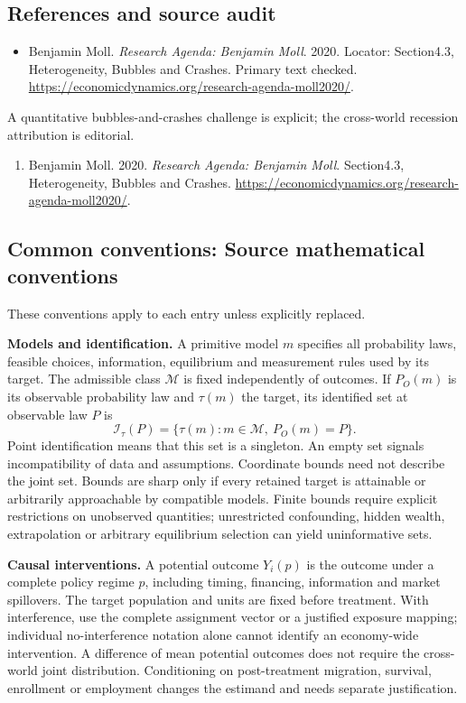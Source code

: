 \documentclass[11pt,a4paper]{article}
\begin{document}
\subsection*{References and source audit}
\begin{itemize}
\item Benjamin Moll. \emph{Research Agenda: Benjamin Moll}. 2020. Locator: Section4.3, Heterogeneity, Bubbles and Crashes. Primary text checked. \url{https://economicdynamics.org/research-agenda-moll2020/}.
\end{itemize}
A quantitative bubbles-and-crashes challenge is explicit; the cross-world recession attribution is editorial.
\begin{enumerate}\raggedright
\item\hypertarget{definitions:source:30007516:1}{} Benjamin Moll. 2020. \emph{Research Agenda: Benjamin Moll}. Section4.3, Heterogeneity, Bubbles and Crashes.
\url{https://economicdynamics.org/research-agenda-moll2020/}.
\end{enumerate}

\subsection*{Common conventions: Source mathematical conventions}

These conventions apply to each entry unless explicitly replaced.

\textbf{Models and identification.} A primitive model \(m\) specifies all probability laws, feasible choices, information, equilibrium and measurement rules used by its target. The admissible class \(\mathcal M\) is fixed independently of outcomes. If \(P_O(m)\) is its observable probability law and \(\tau(m)\) the target, its identified set at observable law \(P\) is
\[
 \mathcal I_\tau(P)=\{\tau(m):m\in\mathcal M,\ P_O(m)=P\}.
\]
Point identification means that this set is a singleton. An empty set signals incompatibility of data and assumptions. Coordinate bounds need not describe the joint set. Bounds are sharp only if every retained target is attainable or arbitrarily approachable by compatible models. Finite bounds require explicit restrictions on unobserved quantities; unrestricted confounding, hidden wealth, extrapolation or arbitrary equilibrium selection can yield uninformative sets.

\textbf{Causal interventions.} A potential outcome \(Y_i(p)\) is the outcome under a complete policy regime \(p\), including timing, financing, information and market spillovers. The target population and units are fixed before treatment. With interference, use the complete assignment vector or a justified exposure mapping; individual no-interference notation alone cannot identify an economy-wide intervention. A difference of mean potential outcomes does not require the cross-world joint distribution. Conditioning on post-treatment migration, survival, enrollment or employment changes the estimand and needs separate justification.
\end{document}
